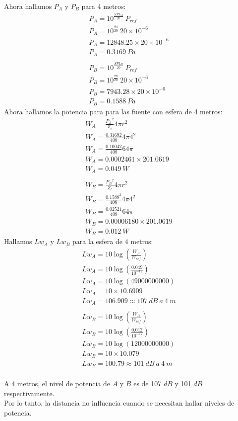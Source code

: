 \documentclass{article}
\begin{document}
Ahora hallamos $P_A$ y $P_B$ para 4 metros:
\begin{gather*}
    P_A = 10^\frac{SPL_A}{20}\ P_{ref}\\
    P_A = 10^\frac{84}{20}\ 20 \times 10^{-6}\\
    P_A = 12848.25 \times 20 \times 10^{-6}\\
    P_A = 0.3169\ Pa\\\\
    P_B = 10^\frac{SPL_B}{20}\ P_{ref}\\
    P_B = 10^\frac{78}{20}\ 20 \times 10^{-6}\\
    P_B = 7943.28 \times 20 \times 10^{-6}\\
    P_B = 0.1588\ Pa
\end{gather*}
Ahora hallamos la potencia para para las fuente con esfera de 4 metros:
\begin{gather*}
    W_A = \frac{{P_A}^2}{Z_c} 4\pi r^2\\
    W_A = \frac{0.31692}{408} 4\pi 4^2\\
    W_A = \frac{0.10042}{408} 64\pi\\
    W_A = 0.0002461 \times 201.0619\\
    W_A = 0.049\ W\\\\
    W_B = \frac{{P_B}^2}{Z_c} 4\pi r^2\\
    W_B = \frac{0.1588^2}{408} 4\pi 4^2\\
    W_B = \frac{0.02521}{408} 64\pi\\
    W_B = 0.00006180 \times 201.0619\\
    W_B = 0.012\ W
\end{gather*}
Hallamos $Lw_A$ y $Lw_B$ para la esfera de 4 metros:
\begin{gather*}
    Lw_A = 10 \log(\frac{W_A}{W_{ref}})\\
    Lw_A = 10 \log(\frac{0.049}{10^{-12}})\\
    Lw_A = 10 \log(49000000000)\\
    Lw_A = 10 \times 10.6909\\
    Lw_A = 106.909 \approx 107\ dB\ a\ 4\ m\\\\
    Lw_B = 10 \log(\frac{W_B}{W_{ref}})\\
    Lw_B = 10 \log(\frac{0.012}{10^{-12}})\\
    Lw_B = 10 \log(12000000000)\\
    Lw_B = 10 \times 10.079\\
    Lw_B = 100.79 \approx 101\ dB\ a\ 4\ m\\
\end{gather*}

A 4 metros, el nivel de potencia de $A$ y $B$ es de 107 $dB$ y 101 $dB$ respectivamente.\\

Por lo tanto, la distancia no influencia cuando se necesitan hallar niveles de potencia.
\end{document}
